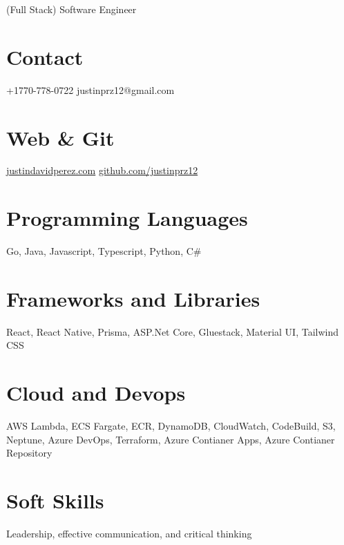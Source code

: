 \documentclass[]{friggeri-cv}
\begin{document}
      {(Full Stack) Software Engineer}
      

\begin{aside}
  \section{Contact}
    +1770-778-0722
    justinprz12@gmail.com
    ~
  \section{Web \& Git}
    \href{http://www.justindavidperez.com}{justindavidperez.com}
    \href{https://github.com/JustinPerez12}{github.com/justinprz12}
  \section{Programming Languages}
    Go, Java, Javascript, Typescript, Python, C\#
  \section{Frameworks and Libraries}
    React, React Native, Prisma, ASP.Net Core, Gluestack, Material UI, Tailwind CSS
  \section{Cloud and Devops}
    AWS Lambda, ECS Fargate, ECR, DynamoDB, CloudWatch, CodeBuild, S3, Neptune, Azure DevOps, Terraform, Azure Contianer Apps, Azure Contianer Repository
  \section{Soft Skills}
    Leadership, effective communication, and critical thinking
\end{aside}
\end{document}
